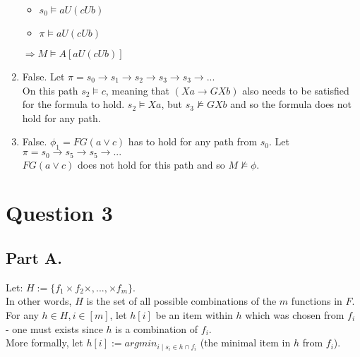\documentclass{article}
\begin{document}
\begin{enumerate}
\begin{itemize}
            \item $s_0\models aU(cUb)$
            \item $\pi\models aU(cUb)$
        \end{itemize}
        $\Rightarrow M\models A[aU(cUb)]$
    \item False. Let $\pi=s_0\rightarrow s_1 \rightarrow s_2 \rightarrow s_3 \rightarrow s_3 \rightarrow ... $ \\ On this path $s_2 \models c$, meaning that $(Xa \rightarrow GXb)$ also needs to be satisfied for the formula to hold. $s_2 \models Xa$, but $s_3 \not\models GXb$ and so the formula does not hold for any path.
    \item False. $\phi_1 = FG(a \vee c)$ has to hold for any path from $s_0$. Let $\pi=s_0\rightarrow s_5 \rightarrow s_5 \rightarrow ... $ \\ $FG(a \vee c)$ does not hold for this path and so $M \not\models \phi$.
\end{enumerate}



\section*{Question 3}
\subsection*{Part A.}
Let: $H:=\{f_1\times f_2\times, ...,\times f_m\}$.\\
In other words, $H$ is the set of all possible combinations of the $m$ functions in $F$.\\
For any $h\in H, i\in[m]$, let $h[i]$ be an item within $h$
which was chosen from $f_i$ - one must exists since $h$ is a combination of $f_i$.\\
More formally, let $h[i]:= argmin_{i\mid s_i\in h\cap f_i}$ (the minimal item in $h$ from $f_i$).\\
\end{document}
